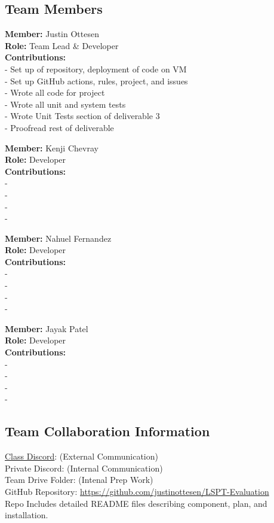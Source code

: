 \subsection*{Team Members}

\textbf{Member:} Justin Ottesen \\
\smallskip\textbf{Role:} Team Lead \& Developer \\
\smallskip\textbf{Contributions:}
\\- Set up of repository, deployment of code on VM
\\- Set up GitHub actions, rules, project, and issues
\\- Wrote all code for project
\\- Wrote all unit and system tests
\\- Wrote Unit Tests section of deliverable 3
\\- Proofread rest of deliverable

\bigskip\textbf{Member:} Kenji Chevray \\
\smallskip\textbf{Role:} Developer \\
\smallskip\textbf{Contributions:}
\\- 
\\- 
\\- 
\\- 

\bigskip\textbf{Member:} Nahuel Fernandez \\
\smallskip\textbf{Role:} Developer \\
\smallskip\textbf{Contributions:}
\\- 
\\- 
\\- 
\\- 

\bigskip\textbf{Member:} Jayak Patel \\
\smallskip\textbf{Role:} Developer \\
\smallskip\textbf{Contributions:}
\\- 
\\- 
\\- 
\\- 

\subsection*{Team Collaboration Information}
\href{https://discord.gg/pMyXUx2X}{Class Discord}: (External Communication)
\\Private Discord: (Internal Communication)
\\Team Drive Folder: (Intenal Prep Work)
\\GitHub Repository: \url{https://github.com/justinottesen/LSPT-Evaluation} 
\\Repo Includes detailed README files describing component, plan, and installation.

